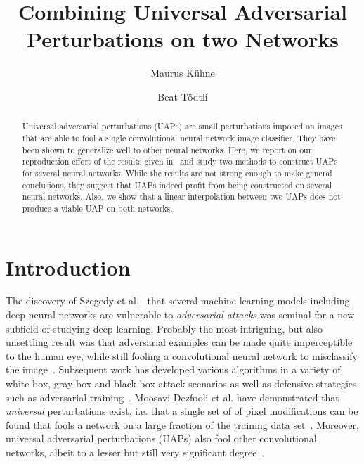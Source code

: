 \documentclass[runningheads]{llncs}
\begin{document}
%
\title{Combining Universal Adversarial Perturbations on two Networks}%
%
%
\author{Maurus K\"uhne \and
Beat Tödtli} %
%
%
%
\maketitle              %
%
\begin{abstract}
Universal adversarial perturbations (UAPs) are small perturbations imposed on images that are able to fool a single convolutional neural network image classifier. They have been shown to generalize well to other neural networks. Here, we report on our reproduction effort of the results given in~\cite{moosavidezfooli_universal_2017} and study two methods to construct UAPs for several neural networks. While the results are not strong enough to make general conclusions, they suggest that UAPs indeed profit from being constructed on several neural networks. Also, we show that a linear interpolation between two UAPs does not produce a viable UAP on both networks.
\end{abstract}
%
%
%
\section{Introduction}
The discovery of Szegedy et al.~\cite{Szegedy_2014} that several machine learning models including deep neural networks are vulnerable to \emph{adversarial attacks} was seminal for a new subfield of studying deep learning. Probably the most intriguing, but also unsettling result was that adversarial examples can be made quite imperceptible to the human eye, while still fooling a convolutional neural network to misclassify the image~\cite{goodfellow_2014}. Subsequent work has developed various algorithms in a variety of white-box, gray-box and black-box attack scenarios as well as defensive strategies such as adversarial training~\cite{REN2020346}. Moosavi-Dezfooli et al. have demonstrated that \emph{universal} perturbations exist, i.e. that a single set of of pixel modifications can be found that fools a network on a large fraction of the training data set~\cite{moosavidezfooli_universal_2017}. Moreover, universal adversarial perturbations (UAPs) also fool other convolutional networks, albeit to a lesser but still very significant degree~\cite{moosavidezfooli_universal_2017}. 
\end{document}
